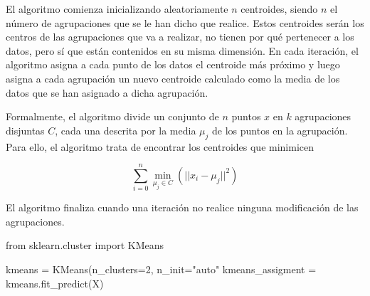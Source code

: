 El algoritmo comienza inicializando aleatoriamente $n$ centroides, siendo $n$ el número de agrupaciones que se le han dicho que realice. Estos centroides serán los centros de las agrupaciones que va a realizar, no tienen por qué pertenecer a los datos, pero sí que están contenidos en su misma dimensión. En cada iteración, el algoritmo asigna a cada punto de los datos el centroide más próximo y luego asigna a cada agrupación un nuevo centroide calculado como la media de los datos que se han asignado a dicha agrupación.

Formalmente, el algoritmo divide un conjunto de $n$ puntos $x$ en $k$ agrupaciones disjuntas $C$, cada una descrita por la media $\mu_j$ de los puntos en la agrupación. Para ello, el algoritmo trata de encontrar los centroides que minimicen

\begin{equation}
  \sum\limits_{i=0}^n \underset{\mu_j \in C}{\operatorname{min}} (|| x_i - \mu_j||^2)
\end{equation}

El algoritmo finaliza cuando una iteración no realice ninguna modificación de las agrupaciones.

\newpage
\begin{mypython}[float={h},caption={k-medias.}]
  from sklearn.cluster import KMeans

  kmeans = KMeans(n_clusters=2, n_init="auto"
  kmeans_assigment = kmeans.fit_predict(X)
\end{mypython}

